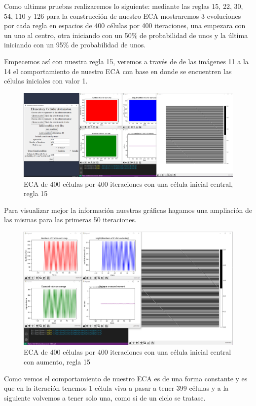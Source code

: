 \documentclass[11pt]{article}
\begin{document}
		Como ultimas pruebas realizaremos lo siguiente:  mediante las reglas 15, 22, 30, 54, 110 y 126 para la construcción de nuestro ECA mostraremos 3 evoluciones por cada regla en espacios de 400 células por 400 iteraciones, una empezara con un uno al centro, otra iniciando con un 50\% de probabilidad de unos y la última iniciando con un 95\% de probabilidad de unos.\par
		Empecemos así con nuestra regla 15, veremos a través de de las imágenes 11 a la 14 el comportamiento de nuestro ECA con base en donde se encuentren las células iniciales con valor 1.
		\begin{figure}[H]
			\centering
			\includegraphics[scale=0.26]{resources/add1.png}
			\caption{ECA de 400 células por 400 iteraciones con una célula inicial central, regla 15}								\label{fig:picture}
		\end{figure}
		Para visualizar mejor la información nuestras gráficas hagamos una ampliación de las mismas para las primeras 50 iteraciones.
		\begin{figure}[H]
			\centering
			\includegraphics[scale=0.35]{resources/add1z.png}
			\caption{ECA de 400 células por 400 iteraciones con una célula inicial central con aumento, regla 15}								\label{fig:picture}
		\end{figure}
		Como vemos el comportamiento de nuestro ECA es de una forma constante y es que en la iteración tenemos 1 célula viva a pasar a tener 399 células y a la siguiente volvemos a tener solo una, como si de un ciclo se tratase.\par
\end{document}
